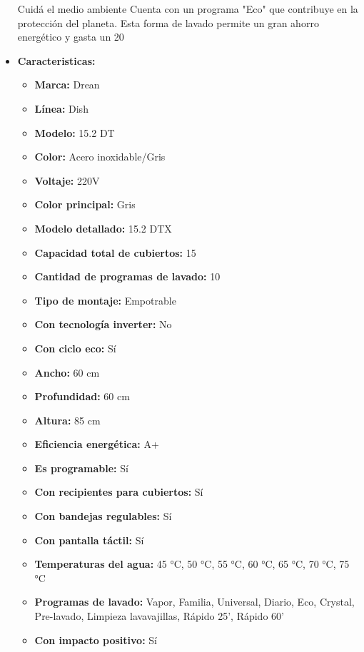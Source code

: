\documentclass{article}
\begin{document}
\begin{adjustwidth}{2em}{}
\begin{itemize}
Cuidá el medio ambiente
Cuenta con un programa "Eco" que contribuye en la protección del planeta. Esta forma de lavado permite un gran ahorro energético y gasta un 20%
        \item \textbf{Caracteristicas:} 
        \begin{itemize}
            \item \textbf {Marca:} Drean
    \item \textbf {Línea:} Dish
    \item \textbf {Modelo:} 15.2 DT
    \item \textbf {Color:} Acero inoxidable/Gris
    \item \textbf {Voltaje:} 220V
    \item \textbf {Color principal:} Gris
    \item \textbf {Modelo detallado:} 15.2 DTX
    \item \textbf {Capacidad total de cubiertos:} 15
    \item \textbf {Cantidad de programas de lavado:} 10
    \item \textbf {Tipo de montaje:} Empotrable
    \item \textbf {Con tecnología inverter:} No
    \item \textbf {Con ciclo eco:} Sí
    \item \textbf {Ancho:} 60 cm
    \item \textbf {Profundidad:} 60 cm
    \item \textbf {Altura:} 85 cm
    \item \textbf {Eficiencia energética:} A+
    \item \textbf {Es programable:} Sí
    \item \textbf {Con recipientes para cubiertos:} Sí
    \item \textbf {Con bandejas regulables:} Sí
    \item \textbf {Con pantalla táctil:} Sí
    \item \textbf {Temperaturas del agua:} 45 °C, 50 °C, 55 °C, 60 °C, 65 °C, 70 °C, 75 °C
    \item \textbf {Programas de lavado:} Vapor, Familia, Universal, Diario, Eco, Crystal, Pre-lavado, Limpieza lavavajillas, Rápido 25', Rápido 60'
    \item \textbf {Con impacto positivo:} Sí
        \end{itemize}
    \end{itemize}

    \vspace{1\baselineskip} %
    \end{adjustwidth}
\end{document}
